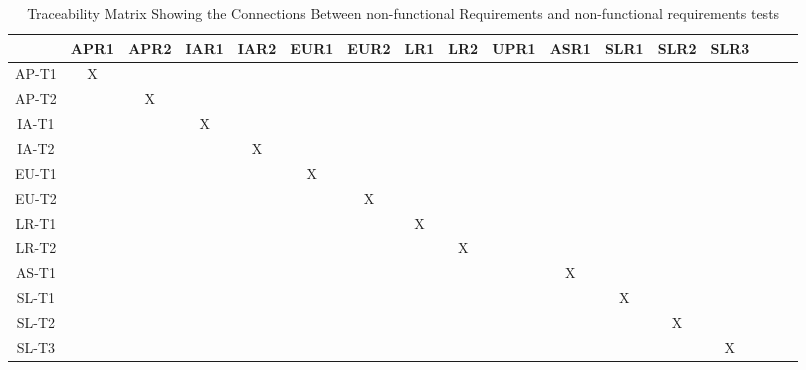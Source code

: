 \documentclass[12pt, titlepage]{article}
\begin{document}
\begin{landscape}
\begin{table}[h!]
\centering
\begin{tabular}{|c|c|c|c|c|c|c|c|c|c|c|c|c|c|c|c|c|}
\hline
	& APR1 & APR2 & IAR1 & IAR2 & EUR1 & EUR2 & LR1 & LR2 & UPR1 & ASR1 & SLR1 & SLR2 & SLR3\\
\hline
AP-T1        &X & & & & & & & & & & & & \\ \hline
AP-T2        & &X & & & & & & & & & & & \\ \hline
IA-T1        & & &X & & & & & & & & & & \\ \hline
IA-T2        & & & &X & & & & & & & & & \\ \hline
EU-T1        & & & & &X & & & & & & & & \\ \hline
EU-T2        & & & & & &X & & & & & & & \\ \hline
LR-T1        & & & & & & &X & & & & & & \\ \hline
LR-T2        & & & & & & & &X & & & & & \\ \hline
AS-T1        & & & & & & & & & &X & & & \\ \hline
SL-T1        & & & & & & & & & & &X & & \\ \hline
SL-T2        & & & & & & & & & & & &X & \\ \hline
SL-T3        & & & & & & & & & & & & &X \\ \hline

\end{tabular}
\caption{Traceability Matrix Showing the Connections Between non-functional Requirements and non-functional requirements tests}
\label{Table:A_trace}
\end{table}
\end{landscape}
\end{document}

